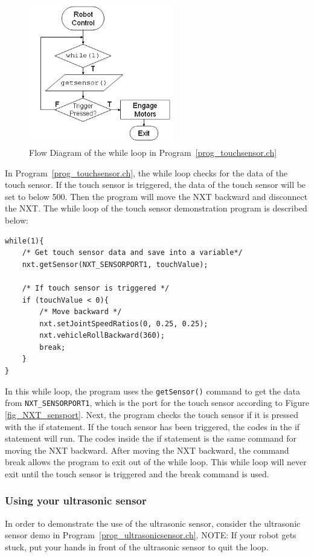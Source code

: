 \documentclass[11pt]{article}
\begin{document}
\begin{figure}[h]
  \begin{center}
    \includegraphics[height=2.4in]{figure/mindstorm/NXT_touchflow.png}
    \caption{Flow Diagram of the while loop in Program~\ref{prog_touchsensor.ch} \label{fig_NXT_touchflow}}
  \end{center}
\end{figure}

\noindent
In Program~\ref{prog_touchsensor.ch}, the while loop checks for the data of the touch sensor. If 
the touch sensor is triggered, the data of the touch sensor will be set to below 500. Then the program 
will move the NXT backward and disconnect the NXT. The while loop of the touch sensor demonstration 
program is described below:
\begin{verbatim}
while(1){
    /* Get touch sensor data and save into a variable*/
    nxt.getSensor(NXT_SENSORPORT1, touchValue);
    
    /* If touch sensor is triggered */
    if (touchValue < 0){
        /* Move backward */
        nxt.setJointSpeedRatios(0, 0.25, 0.25);
        nxt.vehicleRollBackward(360);
        break;
    }
}
\end{verbatim}
In this while loop, the program uses the \verb+getSensor()+ command to get the data from \verb+NXT_SENSORPORT1+, 
which is the port for the touch sensor according to Figure \ref{fig_NXT_sensport}. Next, the program checks 
the touch sensor if it is pressed with the if statement. If the touch sensor has been triggered, the codes 
in the if statement will run. The codes inside the if statement is the same command for moving the NXT 
backward. After moving the NXT backward, the command break allows the program to exit out of the while loop.
 This while loop will never exit until the touch sensor is triggered and the break command is used.

\subsubsection{Using your ultrasonic sensor}
In order to demonstrate the use of the ultrasonic sensor, consider the ultrasonic sensor demo in 
Program~\ref{prog_ultrasonicsensor.ch}. NOTE: If your robot gets stuck, put your hands in 
front of the ultrasonic sensor to quit the loop.
\end{document}

